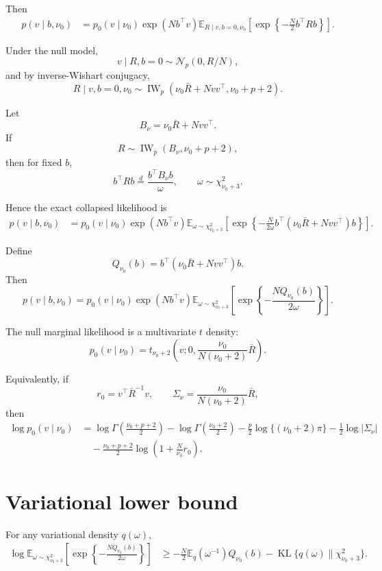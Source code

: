 \documentclass[11pt]{article}
\newcommand{\Rbar}{\bar R}
\newcommand{\nuo}{\nu_0}
\newcommand{\E}{\mathbb E}
\newcommand{\KL}{\operatorname{KL}}
\newcommand{\Normal}{\mathcal N}
\newcommand{\IW}{\operatorname{IW}}
\newcommand{\chisq}{\chi^2}
\begin{document}
Then
\begin{align}
p(v\mid b,\nuo)
&=
p_0(v\mid \nuo)
\exp(Nb^\top v)
\E_{R\mid v,b=0,\nuo}
\left[
\exp\left\{
-\frac N2 b^\top Rb
\right\}
\right]. \label{eq:collapsed_R_expectation}
\end{align}

Under the null model,
\[
v\mid R,b=0 \sim \Normal_p(0,R/N),
\]
and by inverse-Wishart conjugacy,
\[
R\mid v,b=0,\nuo
\sim
\IW_p\left(
\nuo\Rbar+Nvv^\top,
\nuo+p+2
\right).
\]

Let
\[
B_\nu=\nuo\Rbar+Nvv^\top.
\]
If
\[
R\sim \IW_p(B_\nu,\nuo+p+2),
\]
then for fixed \(b\),
\[
b^\top Rb
\overset d=
\frac{b^\top B_\nu b}{\omega},
\qquad
\omega\sim \chisq_{\nuo+3}.
\]

Hence the exact collapsed likelihood is
\begin{align}
p(v\mid b,\nuo)
&=
p_0(v\mid \nuo)
\exp(Nb^\top v)
\E_{\omega\sim \chisq_{\nuo+3}}
\left[
\exp\left\{
-\frac{N}{2\omega}
b^\top(\nuo\Rbar+Nvv^\top)b
\right\}
\right].
\label{eq:collapsed_likelihood}
\end{align}

Define
\[
Q_{\nuo}(b)
=
b^\top(\nuo\Rbar+Nvv^\top)b.
\]
Then
\[
p(v\mid b,\nuo)
=
p_0(v\mid \nuo)
\exp(Nb^\top v)
\E_{\omega\sim \chisq_{\nuo+3}}
\left[
\exp\left\{
-\frac{NQ_{\nuo}(b)}{2\omega}
\right\}
\right].
\]

The null marginal likelihood is a multivariate \(t\) density:
\[
p_0(v\mid \nuo)
=
t_{\nuo+2}
\left(
v;
0,
\frac{\nuo}{N(\nuo+2)}\Rbar
\right).
\]

Equivalently, if
\[
r_0 = v^\top \Rbar^{-1}v,
\qquad
\Sigma_\nu=\frac{\nuo}{N(\nuo+2)}\Rbar,
\]
then
\begin{align}
\log p_0(v\mid \nuo)
&=
\log\Gamma\left(\frac{\nuo+p+2}{2}\right)
-
\log\Gamma\left(\frac{\nuo+2}{2}\right)
-
\frac p2\log\{(\nuo+2)\pi\}
-
\frac12\log|\Sigma_\nu|
\nonumber\\
&\quad
-
\frac{\nuo+p+2}{2}
\log\left(
1+\frac N{\nuo}r_0
\right).
\label{eq:log_p0}
\end{align}

\section{Variational lower bound}

For any variational density \(q(\omega)\),
\begin{align}
\log
\E_{\omega\sim \chisq_{\nuo+3}}
\left[
\exp\left\{
-\frac{NQ_{\nuo}(b)}{2\omega}
\right\}
\right]
&\geq
-\frac N2
\E_q(\omega^{-1})
Q_{\nuo}(b)
-
\KL\{q(\omega)\|\chisq_{\nuo+3}\}.
\end{align}
\end{document}
